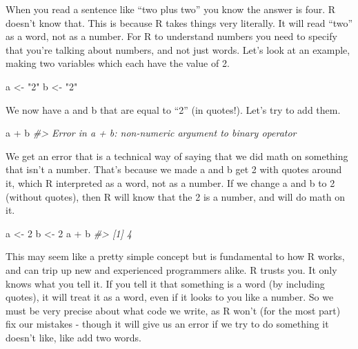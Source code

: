 \documentclass[
]{krantz}
\makeatletter
\newenvironment{Shaded}{\begin{snugshade}}{\end{snugshade}}
\newcommand{\CommentTok}[1]{\textcolor[rgb]{0.37,0.37,0.37}{\textit{#1}}}
\newcommand{\DecValTok}[1]{\textcolor[rgb]{0.06,0.06,0.06}{#1}}
\newcommand{\NormalTok}[1]{#1}
\newcommand{\OtherTok}[1]{\textcolor[rgb]{0.37,0.37,0.37}{#1}}
\newcommand{\SpecialCharTok}[1]{\textcolor[rgb]{0,0,0}{#1}}
\newcommand{\StringTok}[1]{\textcolor[rgb]{0.5,0.5,0.5}{#1}}
\newenvironment{kframe}{%
\medskip{}
\setlength{\fboxsep}{.8em}
 \def\at@end@of@kframe{}%
 \ifinner\ifhmode%
  \def\at@end@of@kframe{\end{minipage}}%
  \begin{minipage}{\columnwidth}%
 \fi\fi%
 \def\FrameCommand##1{\hskip\@totalleftmargin \hskip-\fboxsep
 \colorbox{shadecolor}{##1}\hskip-\fboxsep
     \hskip-\linewidth \hskip-\@totalleftmargin \hskip\columnwidth}%
 \MakeFramed {\advance\hsize-\width
   \@totalleftmargin\z@ \linewidth\hsize
   \@setminipage}}%
 {\par\unskip\endMakeFramed%
 \at@end@of@kframe}
\renewenvironment{Shaded}{\begin{kframe}}{\end{kframe}}
\makeatother
\begin{document}
When you read a sentence like ``two plus two'' you know the answer is four. R doesn't know that. This is because R takes things very literally. It will read ``two'' as a word, not as a number. For R to understand numbers you need to specify that you're talking about numbers, and not just words. Let's look at an example, making two variables which each have the value of 2.

\begin{Shaded}
\begin{Highlighting}[]
\NormalTok{a }\OtherTok{\textless{}{-}} \StringTok{"2"}
\NormalTok{b }\OtherTok{\textless{}{-}} \StringTok{"2"}
\end{Highlighting}
\end{Shaded}

We now have a and b that are equal to ``2'' (in quotes!). Let's try to add them.

\begin{Shaded}
\begin{Highlighting}[]
\NormalTok{a }\SpecialCharTok{+}\NormalTok{ b}
\CommentTok{\#\textgreater{} Error in a + b: non{-}numeric argument to binary operator}
\end{Highlighting}
\end{Shaded}

We get an error that is a technical way of saying that we did math on something that isn't a number. That's because we made a and b get 2 with quotes around it, which R interpreted as a word, not as a number. If we change a and b to 2 (without quotes), then R will know that the 2 is a number, and will do math on it.

\begin{Shaded}
\begin{Highlighting}[]
\NormalTok{a }\OtherTok{\textless{}{-}} \DecValTok{2}
\NormalTok{b }\OtherTok{\textless{}{-}} \DecValTok{2}
\NormalTok{a }\SpecialCharTok{+}\NormalTok{ b}
\CommentTok{\#\textgreater{} [1] 4}
\end{Highlighting}
\end{Shaded}

This may seem like a pretty simple concept but is fundamental to how R works, and can trip up new and experienced programmers alike. R trusts you. It only knows what you tell it. If you tell it that something is a word (by including quotes), it will treat it as a word, even if it looks to you like a number. So we must be very precise about what code we write, as R won't (for the most part) fix our mistakes - though it will give us an error if we try to do something it doesn't like, like add two words.
\end{document}
